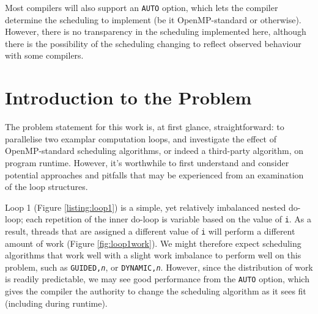 \documentclass{article} %
\newcommand{\tp}{\texttt}
\begin{document}
Most compilers will also support an \tp{AUTO} option, which lets the compiler determine the scheduling to implement (be it OpenMP-standard or otherwise).
However, there is no transparency in the scheduling implemented here, although there is the possibility of the scheduling changing to reflect observed behaviour with some compilers.

\section*{Introduction to the Problem}

The problem statement for this work is, at first glance, straightforward: to parallelise two examplar computation loops, and investigate the effect of OpenMP-standard scheduling algorithms, or indeed a third-party algorithm, on program runtime.
However, it's worthwhile to first understand and consider potential approaches and pitfalls that may be experienced from an examination of the loop structures.

Loop 1 (Figure \ref{listing:loop1}) is a simple, yet relatively imbalanced nested do-loop; each repetition of the inner do-loop is variable based on the value of \texttt{i}.
As a result, threads that are assigned a different value of \tp{i} will perform a different amount of work (Figure \ref{fig:loop1work}).
We might therefore expect scheduling algorithms that work well with a slight work imbalance to perform well on this problem, such as \tp{GUIDED,\textit{n}}, or \tp{DYNAMIC,\textit{n}}. 
However, since the distribution of work is readily predictable, we may see good performance from the \tp{AUTO} option, which gives the compiler the authority to change the scheduling algorithm as it sees fit (including during runtime).
\end{document}
